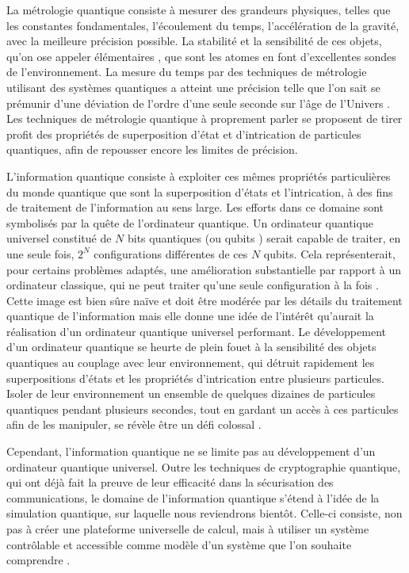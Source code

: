 La métrologie quantique consiste à mesurer des grandeurs physiques, telles que les constantes fondamentales, l'écoulement du temps, l'accélération de la gravité, avec la meilleure précision possible.
La stabilité et la sensibilité de ces objets, qu'on ose appeler \og élémentaires \fg{}, que sont les atomes en font d'excellentes sondes de l'environnement.
La mesure du temps par des techniques de métrologie utilisant des systèmes quantiques a atteint une précision telle que l'on sait se prémunir d'une déviation de l'ordre d'une seule seconde sur l'âge de l'Univers \cite{Ludlow2015,Oates2013}.
Les techniques de métrologie quantique à proprement parler se proposent de tirer profit des propriétés de superposition d'état et d'intrication de particules quantiques, afin de repousser encore les limites de précision.

L'information quantique consiste à exploiter ces mêmes propriétés particulières du monde quantique que sont la superposition d'états et l'intrication, à des fins de traitement de l'information au sens large.
Les efforts dans ce domaine sont symbolisés par la quête de l'ordinateur quantique.
Un ordinateur quantique universel constitué de $N$ bits quantiques (ou \og qubits \fg{}) serait capable de traiter, en une seule fois, $2^N$ configurations différentes de ces $N$ qubits.
Cela représenterait, pour certains problèmes adaptés, une amélioration substantielle par rapport à un ordinateur classique, qui ne peut traiter qu'une seule configuration à la fois \cite{deutsch1985}.
Cette image est bien sûre naïve et doit être modérée par les détails du traitement quantique de l'information mais elle donne une idée de l'intérêt qu'aurait la réalisation d'un ordinateur quantique universel performant.
Le développement d'un ordinateur quantique se heurte de plein fouet à la sensibilité des objets quantiques au couplage avec leur environnement, qui détruit rapidement les superpositions d'états et les propriétés d'intrication entre plusieurs particules.
Isoler de leur environnement un ensemble de quelques dizaines de particules quantiques pendant plusieurs secondes, tout en gardant un accès à ces particules afin de les manipuler, se révèle être un défi colossal \cite{QM_ZUREKDECOH91}.

Cependant, l'information quantique ne se limite pas au développement d'un ordinateur quantique universel.
Outre les techniques de cryptographie quantique, qui ont déjà fait la preuve de leur efficacité dans la sécurisation des communications, le domaine de l'information quantique s'étend à l'idée de la simulation quantique, sur laquelle nous reviendrons bientôt.
Celle-ci consiste, non pas à créer une plateforme universelle de calcul, mais à utiliser un système contrôlable et accessible comme modèle d'un système que l'on souhaite comprendre \cite{Feynman1982}.

